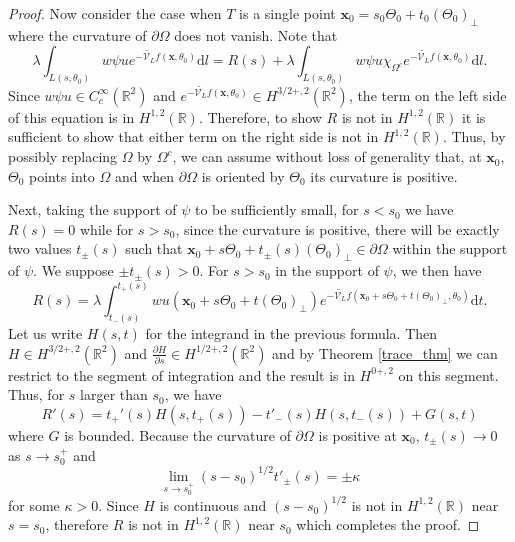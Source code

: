 \documentclass[a4paper,12pt]{amsart}
\numberwithin{equation}{section}
\theoremstyle{plain}
\numberwithin{theorem}{section}
\theoremstyle{definition}
\theoremstyle{remark}
\theoremstyle{remark}
\theoremstyle{remark}
\newcommand{\dd}{\mathrm{d}}  %
\newcommand{\vx}{{\mathbf{x}}}
\begin{document}
\begin{proof}
Now consider the case when $T$ is a single point $\vx_0 = s_0 \Theta_0 + t_0 (\Theta_0)_\perp$ where the curvature of $\partial \Omega$ does not vanish. Note that
\[
\lambda \int_{L(s,\theta_0)} w \psi u e^{-\widetilde{\mathcal{V}_{L}}f(\vx,\theta_0)} \dd l = R(s) + \lambda \int_{L(s,\theta_0)} w \psi u \chi_{\Omega^c} e^{-\widetilde{\mathcal{V}_{L}}f(\vx,\theta_0)} \dd l.
\]
Since $w \psi u \in C_c^\infty(\mathbb{R}^2)$ and $e^{-\widetilde{\mathcal{V}_{L}}f(\vx,\theta_0)} \in H^{3/2+,2}(\mathbb{R}^2)$, the term on the left side of this equation is in $H^{1,2}(\mathbb{R})$. Therefore, to show $R$ is not in $H^{1,2}(\mathbb{R})$ it is sufficient to show that either term on the right side is not in $H^{1,2}(\mathbb{R})$. Thus, by possibly replacing $\Omega$ by $\Omega^c$, we can assume without loss of generality that, at $\vx_0$, $\Theta_0$ points into $\Omega$ and when $\partial \Omega$ is oriented by $\Theta_0$ its curvature is positive.

Next, taking the support of $\psi$ to be sufficiently small, for $s<s_0$ we have $R(s) = 0$ while for $s>s_0$, since the curvature is positive, there will be exactly two values $t_\pm(s)$ such that $\vx_0 + s \Theta_0 + t_\pm(s) (\Theta_0)_\perp \in \partial \Omega$ within the support of $\psi$. We suppose $\pm t_\pm(s)>0$. For $s>s_0$ in the support of $\psi$, we then have
\[
R(s) = \lambda \int_{t_-(s)}^{t_+(s)} wu(\vx_0 + s  \Theta_0 + t (\Theta_0)_\perp) e^{-\widetilde{\mathcal{V}_{L}}f(\vx_0 + s  \Theta_0 + t (\Theta_0)_\perp,\theta_0)}\dd t.
\]
Let us write $H(s,t)$ for the integrand in the previous formula. Then $H \in H^{3/2+,2}(\mathbb{R}^2)$ and $\frac{\partial H}{\partial s} \in H^{1/2+,2}(\mathbb{R}^2)$ and by Theorem \ref{trace_thm} we can restrict to the segment of integration and the result is in $H^{0+,2}$ on this segment. Thus, for $s$ larger than $s_0$, we have
\[
R'(s) = t_+'(s) H(s,t_+(s)) - t'_-(s) H(s,t_-(s)) + G(s,t)
\]
where $G$ is bounded. Because the curvature of $\partial \Omega$ is positive at $\vx_0$, $t_\pm(s) \rightarrow 0$ as $s \rightarrow s_0^+$ and
\[
\lim_{s\rightarrow s_0^+} (s-s_0)^{1/2} t'_{\pm}(s) = \pm \kappa
\]
for some $\kappa > 0$. Since $H$ is continuous and $(s-s_0)^{1/2}$ is not in $H^{1,2}(\mathbb{R})$ near $s = s_0$, therefore $R$ is not in $H^{1,2}(\mathbb{R})$ near $s_0$ which completes the proof.
\end{proof}
\end{document}
